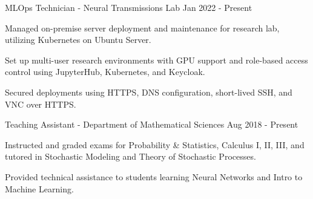 \begin{cventries}
	\vspace{-2mm}

	\cventry
	{MLOps Technician - Neural Transmissions Lab}
	{}
	{}
	{Jan 2022 - Present}
	{\begin{cvitems}
			\item {Managed on-premise server deployment and maintenance for research lab, utilizing Kubernetes on Ubuntu Server.}
			\item {Set up multi-user research environments with GPU support and role-based access control using JupyterHub, Kubernetes, and Keycloak.}
			\item {Secured deployments using HTTPS, DNS configuration, short-lived SSH, and VNC over HTTPS.}
		\end{cvitems}}

	\vspace{-2mm}

	\cventry
	{Teaching Assistant - Department of Mathematical Sciences}
	{}
	{}
	{Aug 2018 - Present}
	{\begin{cvitems}
			\item {Instructed and graded exams for Probability \& Statistics, Calculus I, II, III, and tutored in Stochastic Modeling and Theory of Stochastic Processes.}
			\item {Provided technical assistance to students learning Neural Networks and Intro to Machine Learning.}
		\end{cvitems}}

	\vspace{-1mm}


\end{cventries}